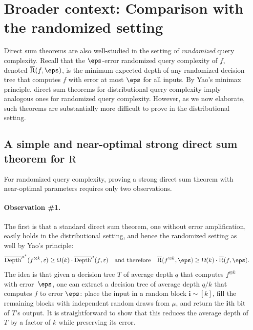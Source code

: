 \documentclass[11pt]{article}
\begin{document}
\section{Broader context: Comparison with the randomized setting}
\label{sec:challenges}

Direct sum theorems are also well-studied in the setting of {\sl randomized} query complexity. Recall that the $\eps$-error randomized query complexity of $f$, denoted $\overline{\mathrm{R}}(f,\eps)$, is the minimum expected depth of any randomized  decision tree that computes $f$ with error at most $\eps$ for all inputs.  By Yao's minimax principle, direct sum theorems for distributional query complexity imply analogous ones for randomized query complexity. However, as we now elaborate, such theorems are substantially more difficult to prove in the distributional setting. 


\subsection{A simple and near-optimal strong direct sum theorem for $\overline{\mathrm{R}}$} 
\label{sec:simple}
For randomized query complexity, proving a strong direct sum theorem with near-optimal parameters requires only two observations. 

\paragraph{Observation \#1.} The first is that a standard direct sum theorem, one without error amplification, easily holds in the distributional setting, and hence the randomized setting as well by Yao's principle:
\begin{equation}
\overline{\mathrm{Depth}}^{\mu^k}(f^{\otimes k},\varepsilon) \ge \Omega(k) \cdot \overline{\mathrm{Depth}}^{\mu}(f,\varepsilon) \quad \text{and therefore} \quad \overline{\mathrm{R}}(f^{\otimes k},\eps) \ge \Omega(k)\cdot \overline{\mathrm{R}}(f,\eps). \label{eq:BDK1} \end{equation} 
The idea is that given a decision tree $T$ of average depth $q$ that computes $f^{\otimes k}$ with error~$\eps$, one can extract a decision tree of average depth $q/k$ that computes $f$ to error $\eps$:  place the input in a random block $\boldsymbol{i}\sim [k]$, fill the remaining blocks with independent random draws from $\mu$, and return the $\boldsymbol{i}$th bit of $T$'s output. It is straightforward to show that this reduces the average depth of $T$ by a factor of $k$ while preserving its error. 
\end{document}
